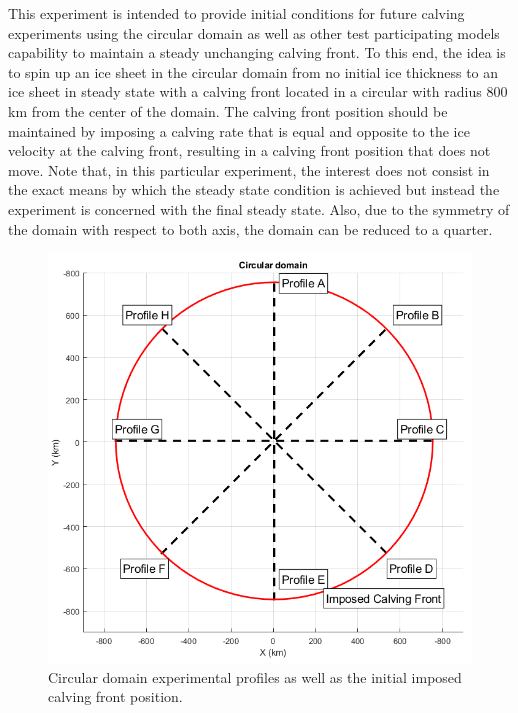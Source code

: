 \documentclass{article}
\begin{document}
This experiment is intended to provide initial conditions for future calving experiments using the circular domain as well as other test participating models capability to maintain a steady unchanging calving front. To this end, the idea is to spin up an ice sheet in the circular domain from no initial ice thickness to an ice sheet in steady state with a calving front located in a circular with radius 800 km from the center of the domain. The calving front position should be maintained by imposing a calving rate that is equal and opposite to the ice velocity at the calving front, resulting in a calving front position that does not move.
Note that, in this particular experiment, the interest does not consist in the exact means by which the steady state condition is achieved but instead the experiment is concerned with the final steady state. 
Also, due to the symmetry of the domain with respect to both axis, the domain can be reduced to a quarter.

\begin{figure}[!h]
	\centering
	\includegraphics[width=0.7\linewidth]{../fig/cone.png}
	\caption{Circular domain experimental profiles as well as the initial imposed calving front position.}
	\label{cone_profile}
\end{figure}
\end{document}

